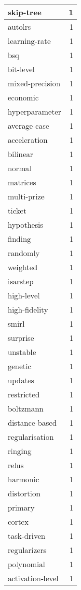 \begin{table}[h]
\begin{tabular}{|l|r|}
\hline
skip-tree & 1 \\
\hline
autolrs & 1 \\
\hline
learning-rate & 1 \\
\hline
bsq & 1 \\
\hline
bit-level & 1 \\
\hline
mixed-precision & 1 \\
\hline
economic & 1 \\
\hline
hyperparameter & 1 \\
\hline
average-case & 1 \\
\hline
acceleration & 1 \\
\hline
bilinear & 1 \\
\hline
normal & 1 \\
\hline
matrices & 1 \\
\hline
multi-prize & 1 \\
\hline
ticket & 1 \\
\hline
hypothesis & 1 \\
\hline
finding & 1 \\
\hline
randomly & 1 \\
\hline
weighted & 1 \\
\hline
isarstep & 1 \\
\hline
high-level & 1 \\
\hline
high-fidelity & 1 \\
\hline
smirl & 1 \\
\hline
surprise & 1 \\
\hline
unstable & 1 \\
\hline
genetic & 1 \\
\hline
updates & 1 \\
\hline
restricted & 1 \\
\hline
boltzmann & 1 \\
\hline
distance-based & 1 \\
\hline
regularisation & 1 \\
\hline
ringing & 1 \\
\hline
relus & 1 \\
\hline
harmonic & 1 \\
\hline
distortion & 1 \\
\hline
primary & 1 \\
\hline
cortex & 1 \\
\hline
task-driven & 1 \\
\hline
regularizers & 1 \\
\hline
polynomial & 1 \\
\hline
activation-level & 1 \\

\end{tabular}
\end{table}
